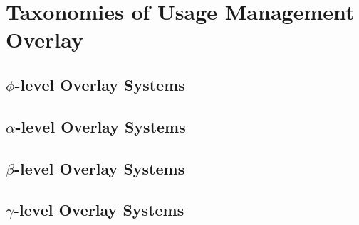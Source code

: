 \section{Taxonomies of Usage Management Overlay}

\subsection{$\phi$-level Overlay Systems}

\subsection{$\alpha$-level Overlay Systems}

\subsection{$\beta$-level Overlay Systems}

\subsection{$\gamma$-level Overlay Systems}